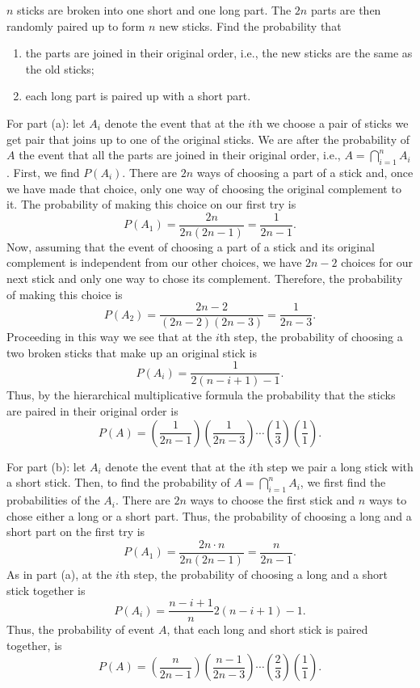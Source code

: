 \begin{problem}[Handout 3, \# 3]
  \(n\) sticks are broken into one short and one long part. The \(2n\)
  parts are then randomly paired up to form \(n\) new sticks. Find the
  probability that
  \begin{enumerate}[label=(\alph*),noitemsep]
  \item the parts are joined in their original order, i.e., the new sticks
    are the same as the old sticks;
  \item each long part is paired up with a short part.
  \end{enumerate}
\end{problem}
\begin{solution}
  For part (a): let \(A_i\) denote the event that at the \(i\)th we choose
  a pair of sticks we get pair that joins up to one of the original
  sticks. We are after the probability of \(A\) the event that all the
  parts are joined in their original order, i.e.,
  \(A=\bigcap_{i=1}^n A_i\). First, we find \(P(A_i)\). There are \(2n\)
  ways of choosing a part of a stick and, once we have made that choice,
  only one way of choosing the original complement to it. The probability
  of making this choice on our first try is
  \[
    P(A_1)=\frac{2n}{2n(2n-1)}=\frac{1}{2n-1}.
  \]
  Now, assuming that the event of choosing a part of a stick and its
  original complement is independent from our other choices, we have
  \(2n-2\) choices for our next stick and only one way to chose its
  complement. Therefore, the probability of making this choice is
  \[
    P(A_2)=\frac{2n-2}{(2n-2)(2n-3)}=\frac{1}{2n-3}.
  \]
  Proceeding in this way we see that at the \(i\)th step, the probability
  of choosing a two broken sticks that make up an original stick is
  \[
    P(A_i)=\frac{1}{2(n-i+1)-1}.
  \]
  Thus, by the hierarchical multiplicative formula the probability that the
  sticks are paired in their original order is
  \[
    P(A)=\left(\frac{1}{2n-1}\right)\left(\frac{1}{2n-3}\right) \dotsm
    \left(\frac{1}{3}\right)\left(\frac{1}{1}\right).
  \]

  For part (b): let \(A_i\) denote the event that at the \(i\)th step we
  pair a long stick with a short stick. Then, to find the probability of
  \(A=\bigcap_{i=1}^n A_i\), we first find the probabilities of the
  \(A_i\). There are \(2n\) ways to choose the first stick and \(n\) ways
  to chose either a long or a short part. Thus, the probability of choosing
  a long and a short part on the first try is
  \[
    P(A_1)=\frac{2n\cdot n}{2n(2n-1)}=\frac{n}{2n-1}.
  \]
  As in part (a), at the \(i\)th step, the probability of choosing a long
  and a short stick together is
  \[
    P(A_i)=\frac{n-i+1}n{2(n-i+1)-1}.
  \]
  Thus, the probability of event \(A\), that each long and short stick is
  paired together, is
  \[
    P(A)=\left(\frac{n}{2n-1}\right)\left(\frac{n-1}{2n-3}\right)\dotsm
    \left(\frac{2}{3}\right)\left(\frac{1}{1}\right).
  \]
\end{solution}
